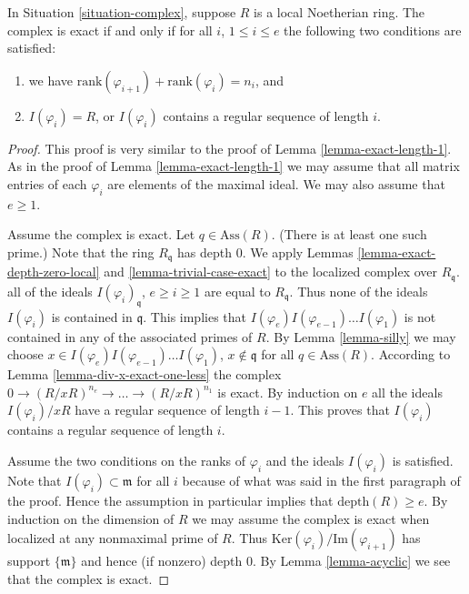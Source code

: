 \begin{proposition}
\label{proposition-what-exact}
In Situation \ref{situation-complex}, suppose $R$ is
a local Noetherian ring. The complex is exact if and
only if for all $i$, $1 \leq i \leq e$
the following two conditions are satisfied:
\begin{enumerate}
\item we have $\text{rank}(\varphi_{i + 1}) + \text{rank}(\varphi_i)
= n_i$, and
\item $I(\varphi_i) = R$, or $I(\varphi_i)$ contains a
regular sequence of length $i$.
\end{enumerate}
\end{proposition}

\begin{proof}
This proof is very similar to the proof of Lemma
\ref{lemma-exact-length-1}.
As in the proof of Lemma \ref{lemma-exact-length-1} we may assume
that all matrix entries of each $\varphi_i$ are elements of
the maximal ideal. We may also assume that $e \geq 1$.

\medskip\noindent
Assume the complex is exact. Let $q \in \text{Ass}(R)$.
(There is at least one such prime.)
Note that the ring $R_{\mathfrak q}$ has depth $0$.
We apply Lemmas \ref{lemma-exact-depth-zero-local} and
\ref{lemma-trivial-case-exact} to the localized complex
over $R_{\mathfrak q}$. all of the ideals
$I(\varphi_i)_{\mathfrak q}$, $e \geq i \geq 1$
are equal to $R_{\mathfrak q}$. Thus none of the ideals
$I(\varphi_i)$ is contained in $\mathfrak q$.
This implies that $I(\varphi_e)I(\varphi_{e-1})\ldots I(\varphi_1)$
is not contained in any of the associated primes
of $R$. By Lemma \ref{lemma-silly} we may choose
$x \in I(\varphi_e)I(\varphi_{e-1})\ldots I(\varphi_1)$,
$x \not \in \mathfrak q$ for all $q\in \text{Ass}(R)$.
According to Lemma \ref{lemma-div-x-exact-one-less}
the complex $0 \to (R/xR)^{n_e}
\to \ldots \to (R/xR)^{n_1}$ is exact. By induction
on $e$ all the ideals $I(\varphi_i)/xR$ have a regular
sequence of length $i-1$. This proves that $I(\varphi_i)$
contains a regular sequence of length $i$.

\medskip\noindent
Assume the two conditions on the ranks of $\varphi_i$
and the ideals $I(\varphi_i)$ is satisfied. Note that
$I(\varphi_i) \subset \mathfrak m$ for all $i$ because
of what was said in the first paragraph of the proof.
Hence the assumption in particular implies that
$\text{depth}(R) \geq e$. By induction
on the dimension of $R$ we may assume the complex
is exact when localized at any nonmaximal prime of $R$.
Thus $\text{Ker}(\varphi_i)/\text{Im}(\varphi_{i + 1})$
has support $\{\mathfrak m\}$ and hence (if nonzero)
depth $0$. By Lemma \ref{lemma-acyclic} we see
that the complex is exact.
\end{proof}












